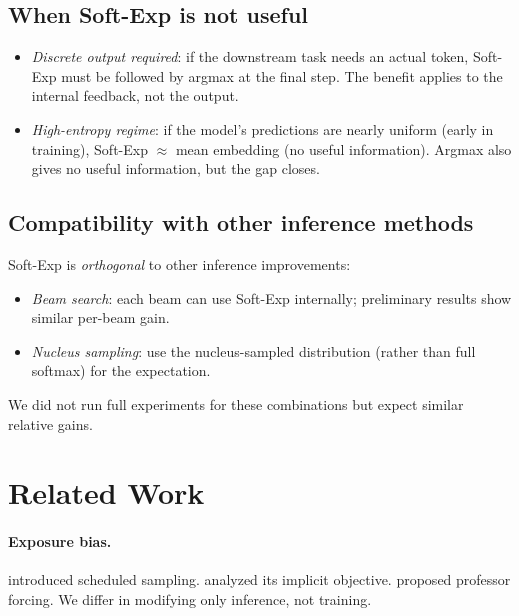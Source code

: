 \documentclass{article}
\begin{document}
\subsection{When Soft-Exp is not useful}

\begin{itemize}
    \item \emph{Discrete output required}: if the downstream task needs an actual token, Soft-Exp must be followed by argmax at the final step. The benefit applies to the internal feedback, not the output.
    \item \emph{High-entropy regime}: if the model's predictions are nearly uniform (early in training), Soft-Exp $\approx$ mean embedding (no useful information). Argmax also gives no useful information, but the gap closes.
\end{itemize}

\subsection{Compatibility with other inference methods}

Soft-Exp is \emph{orthogonal} to other inference improvements:
\begin{itemize}
    \item \emph{Beam search}: each beam can use Soft-Exp internally; preliminary results show similar per-beam gain.
    \item \emph{Nucleus sampling}: use the nucleus-sampled distribution (rather than full softmax) for the expectation.
\end{itemize}
We did not run full experiments for these combinations but expect similar relative gains.

\section{Related Work}

\paragraph{Exposure bias.}
\citet{bengio2015scheduled} introduced scheduled sampling.
\citet{huszar2015how} analyzed its implicit objective.
\citet{darien2017} proposed professor forcing.
We differ in modifying only inference, not training.
\end{document}
